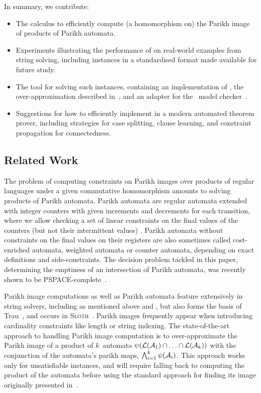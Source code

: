 In summary, we contribute:
\begin{itemize}
    \item The \Calculus{} calculus to efficiently compute (a homomorphism on) the
          Parikh image of products of Parikh automata.
    \item Experiments illustrating the performance of \Calculus{} on real-world examples from string solving, including \NrBenchmarks{} instances in a standardised format made available for future study.
    \item The \Catra{} tool for solving such instances, containing an implementation of \Calculus{}, the over-approximation described in~\cite{approximate-parikh}, and an adapter for the~\Nuxmv{} model checker~\cite{nuxmv}.
    \item Suggestions for how to efficiently implement \Calculus{} in a modern automated theorem prover, including strategies for case splitting, clause learning, and constraint propagation for connectedness.
\end{itemize}

\subsection{Related Work}

The problem of computing constraints on Parikh images over products of regular
languages under a given commutative homomorphism amounts to solving products of
Parikh automata. Parikh automata are regular automata extended with integer
counters with given increments and decrements for each transition, where we
allow checking a set of linear constraints on the final values of the counters
(but not their intermittent values) \cite{parikh-automata}. Parikh automata
without constraints on the final values on their registers are also sometimes
called cost-enriched automata, weighted automata or counter automata, depending
on exact definitions and side-constraints. The decision problem tackled in this
paper, determining the emptiness of an intersection of Parikh automata, was
recently shown to be PSPACE-complete~\cite{graph-queries}.

Parikh image computations as well as Parikh automata feature extensively in
string solvers, including as mentioned above \Ostrich{} and \OstrichPlus{}
\cite{ostrich,ostrich-plus}, but also forms the basis of Trau~\cite{trau-pldi},
and occurs in \textsc{Sloth}~\cite{sloth}. Parikh images frequently appear when
introducing cardinality constraints like length or string indexing. The
state-of-the-art approach to handling Parikh image computation is to
over-approximate the Parikh image of a product of $k$~automata
$\operatorname{\psi}(\operatorname{\mathcal{L}}(\mathcal{A}_1) \cap \ldots \cap \operatorname{\mathcal{L}}(\mathcal{A}_k))$ with the
conjunction of the automata's parikh maps, $\bigwedge_{i=1}^{k}
    \operatorname{\psi}(\mathcal{A}_i)$. This approach works only for unsatisfiable instances,
and will require falling back to computing the product of the automata before
using the standard approach for finding its image originally presented
in~\cite{generate-parikh-image}.

